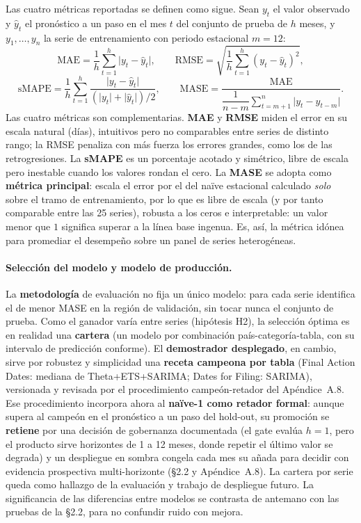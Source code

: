 \documentclass[12pt,letterpaper]{report}
\begin{document}
Las cuatro métricas reportadas se definen como sigue. Sean $y_t$ el valor observado y
$\hat{y}_t$ el pronóstico a un paso en el mes $t$ del conjunto de prueba de $h$ meses, y
$y_1,\dots,y_n$ la serie de entrenamiento con periodo estacional $m=12$:
\begin{equation}
\mathrm{MAE} = \frac{1}{h}\sum_{t=1}^{h} \lvert y_t-\hat{y}_t\rvert,
\qquad
\mathrm{RMSE} = \sqrt{\frac{1}{h}\sum_{t=1}^{h}\left(y_t-\hat{y}_t\right)^2},
\end{equation}
\begin{equation}
\mathrm{sMAPE} = \frac{1}{h}\sum_{t=1}^{h}
\frac{\lvert y_t-\hat{y}_t\rvert}{\left(\lvert y_t\rvert+\lvert \hat{y}_t\rvert\right)/2},
\qquad
\mathrm{MASE} = \frac{\mathrm{MAE}}
{\dfrac{1}{n-m}\displaystyle\sum_{t=m+1}^{n} \lvert y_t - y_{t-m}\rvert}.
\end{equation}
Las cuatro métricas son complementarias. \textbf{MAE} y \textbf{RMSE} miden el error en su
escala natural (días), intuitivos pero no comparables entre series de distinto rango; la RMSE
penaliza con más fuerza los errores grandes, como los de las retrogresiones. La \textbf{sMAPE} es
un porcentaje acotado y simétrico, libre de escala pero inestable cuando los valores rondan el
cero. La \textbf{MASE} se adopta como \textbf{métrica principal}: escala el error por el del naïve
estacional calculado \textit{solo} sobre el tramo de entrenamiento, por lo que es libre de escala
(y por tanto comparable entre las 25 series), robusta a los ceros e interpretable: un valor menor
que $1$ significa superar a la línea base ingenua. Es, así, la métrica idónea para promediar el
desempeño sobre un panel de series heterogéneas.

\paragraph{Selección del modelo y modelo de producción.} La \textbf{metodología} de evaluación no
fija un único modelo: para cada serie identifica el de menor MASE en la región de validación, sin
tocar nunca el conjunto de prueba. Como el ganador varía entre series (hipótesis H2), la selección
óptima es en realidad una \textbf{cartera} (un modelo por combinación país-categoría-tabla, con su
intervalo de predicción conforme). El \textbf{demostrador desplegado}, en cambio, sirve por
robustez y simplicidad una \textbf{receta campeona por tabla} (Final Action Dates: mediana de
Theta+ETS+SARIMA; Dates for Filing: SARIMA), versionada y revisada por el procedimiento
campeón-retador del Apéndice~A.8. Ese procedimiento incorpora ahora al \textbf{naïve-1 como
retador formal}: aunque supera al campeón en el pronóstico a un paso del hold-out, su
promoción se \textbf{retiene} por una decisión de gobernanza documentada (el gate evalúa
$h=1$, pero el producto sirve horizontes de 1 a 12 meses, donde repetir el último valor se
degrada) y un despliegue en sombra congela cada mes su añada para decidir con evidencia
prospectiva multi-horizonte (§2.2 y Apéndice~A.8). La cartera por serie queda como hallazgo
de la evaluación y trabajo de despliegue futuro. La significancia de las diferencias entre
modelos se contrasta de antemano con las pruebas de la §2.2, para no confundir ruido con
mejora.
\end{document}
